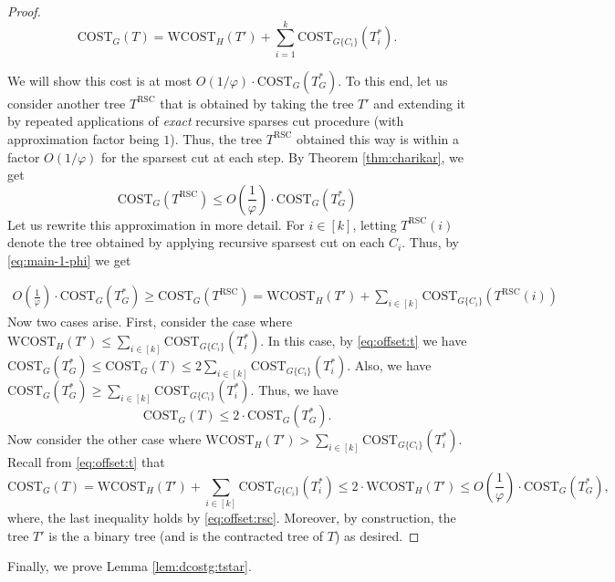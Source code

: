 \documentclass[letterpaper,11pt]{article}
\newcommand{\CT}{\text{COST}}
\newcommand{\wCT}{\text{WCOST}}
\theoremstyle{plain}
\theoremstyle{definition}
\theoremstyle{remark}
\begin{document}
\begin{proof}
	\begin{equation} \label{eq:offset:t}
		\CT_G(T) = \wCT_H(T') + \sum_{i=1}^k \CT_{G\{C_i\}}(T^*_i). 
	\end{equation}

	We will show this cost is at most $O(1/\varphi) \cdot  \CT_G(T^*_G)$. To this end, let us consider another tree $T^{\text{RSC}}$ that is obtained by taking the tree $T'$ and 
	extending it by repeated applications of \emph{exact} recursive sparses cut procedure (with 
	approximation factor being $1$). Thus, the tree $T^{\text{RSC}}$ obtained this way
	is within a factor $O(1/\varphi)$ for the sparsest cut at each step. 
	By Theorem \ref{thm:charikar}, we get 
\begin{equation}
\label{eq:main-1-phi}
\CT_G(T^{\text{RSC}}) \leq O\left(\frac{1}{\varphi}\right)\cdot \CT_G(T^*_G)
\end{equation}	
	Let us rewrite this approximation in more detail. For $i \in [k]$, letting $T^{\text{RSC}}(i)$ 
	denote the tree obtained by applying recursive sparsest cut on each $C_i$. Thus, by \eqref{eq:main-1-phi} we get

	\begin{align}
		O\left(\frac{1}{\varphi}\right)\cdot \CT_G(T^*_G) \geq \CT_G(T^{\text{RSC}})  = \wCT_H(T') + \sum_{i \in [k]} \CT_{G\{C_i\}}(T^{\text{RSC}}(i))  
\label{eq:offset:rsc} 
	\end{align}
	Now two cases arise. First, consider the case where $\wCT_H(T') \leq \sum_{i\in [k]} \CT_{G\{C_i\}}(T^*_i)$.
	In this case, by \eqref{eq:offset:t} we have 
	$\CT_G(T^*_G) \leq \CT_G(T) \leq 2 \sum_{i\in [k]} \CT_{G\{C_i\}}(T^*_i)$. Also, we have 
	$\CT_G(T^*_G) \geq  \sum_{i\in [k]} \CT_{G\{C_i\}}(T^*_i)$. Thus, we have 
	\[\CT_G(T) \leq 2\cdot \CT_G(T^*_G) \text{.}\]	
	Now consider the other case where $\wCT_H(T') >  \sum_{i\in [k]} \CT_{G\{C_i\}}(T^*_i)$.
	Recall from \eqref{eq:offset:t} that 
	$$\CT_G(T) = \wCT_H(T') + \sum_{i \in [k]} \CT_{G\{C_i\}}(T^*_i) \leq 2 \cdot \wCT_H(T') \leq O\left(\frac{1}{\varphi}\right) \cdot \CT_G(T^*_G)\text{,} $$
	where, the last inequality holds by \eqref{eq:offset:rsc}. Moreover, by construction, the tree $T'$ 
	is the a binary tree (and is the contracted tree of $T$) 
	as desired.


\end{proof}

Finally, we prove Lemma \ref{lem:dcostg:tstar}. 
\optcost*
\end{document}
